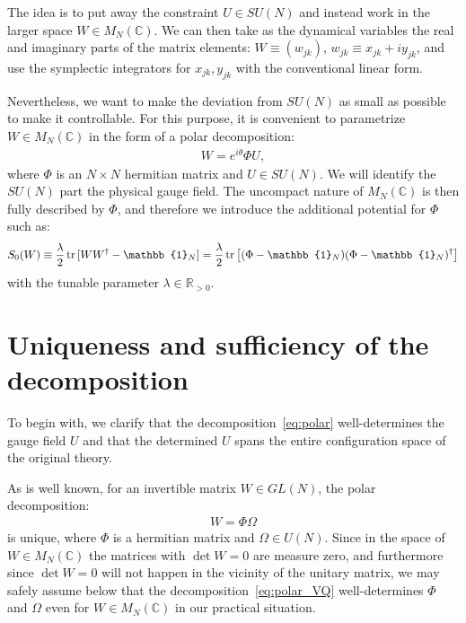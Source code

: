 \documentclass[12pt]{article}
\begin{document}
The idea is to put away the constraint $U \in SU(N)$
and instead work in the larger space $W \in M_N(\mathbb{C})$.
We can then take as the dynamical variables the real and imaginary parts
of the matrix elements:
$W \equiv (w_{jk})$, $w_{jk} \equiv x_{jk}+iy_{jk}$,
and use the symplectic integrators
for $x_{jk}, y_{jk}$ with the conventional linear form.

Nevertheless, we want to make the deviation
from $SU(N)$ as small as possible
to make it controllable.
For this purpose, it is convenient to parametrize $W \in M_N(\mathbb{C})$
in the form of a polar decomposition:
\begin{align}
  W = e^{i\theta} \Phi U,
  \label{eq:polar}
\end{align}
where $\Phi$ is an $N\times N$ hermitian matrix and $U \in SU(N)$.
We will identify the $SU(N)$ part the physical gauge field.
The uncompact nature of $M_N(\mathbb{C})$ is then fully described by $\Phi$,
and therefore we introduce the additional potential
for $\Phi$ such as:
\begin{align}
  S_0(W)
  \equiv \frac{\lambda}{2} \, {\rm tr} \,[W W^\dagger-\mathbb{1}_N]
  = \frac{\lambda}{2} \,{\rm tr} \,
  \big[
  (\Phi-\mathbb{1}_N)(\Phi-\mathbb{1}_N)^\dagger
  \big]
  \label{eq:s0}
\end{align}
with the tunable parameter $\lambda \in \mathbb{R}_{>0}$.


\section{Uniqueness and sufficiency of the decomposition}
\label{sec:polar}

To begin with,
we clarify that the decomposition~\eqref{eq:polar}
well-determines the gauge field $U$ and
that the determined $U$ spans the entire configuration space
of the original theory.

As is well known, for an invertible matrix $W \in GL(N)$,
the polar decomposition:
\begin{align}
  W = \Phi \Omega
  \label{eq:polar_VQ}
\end{align}
is unique, where $\Phi$ is a hermitian matrix and $\Omega \in U(N)$.
Since in the space of $W \in M_N(\mathbb{C})$
the matrices with $\det W=0$ are measure zero,
and furthermore since $\det W=0$ will not
happen in the vicinity of the unitary matrix,
we may safely assume below
that the decomposition~\eqref{eq:polar_VQ}
well-determines $\Phi$ and $\Omega$
even for $W \in M_N(\mathbb{C})$
in our practical situation.
\end{document}
